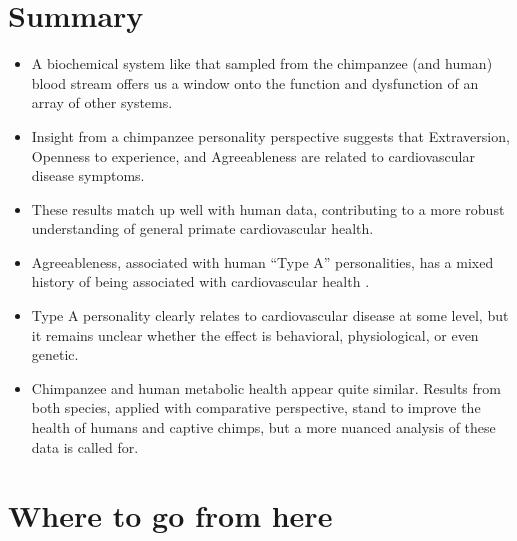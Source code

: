 \documentclass[a0,landscape]{a0poster}
\begin{document}

\color{NavyBlue}
\section*{Summary}

\begin{itemize}
\color{NavyBlue}
\item A biochemical system like that sampled from the chimpanzee (and human) blood stream offers us a window onto the function and dysfunction of an array of other systems.
\item Insight from a chimpanzee personality perspective suggests that Extraversion, Openness to experience, and Agreeableness are related to cardiovascular disease symptoms.
\item These results match up well with human data, contributing to a more robust understanding of general primate cardiovascular health.
\item Agreeableness, associated with human ``Type A'' personalities, has a mixed history of being associated with cardiovascular health \cite{sutin2010cholesterol}.
\item Type A personality clearly relates to cardiovascular disease at some level, but it remains unclear whether the effect is behavioral, physiological, or even genetic.
\item Chimpanzee and human metabolic health appear quite similar. Results from both species, applied with comparative perspective, stand to improve the health of humans and captive chimps, but a more nuanced analysis of these data is called for.


\end{itemize}



\color{Maroon}
\section*{Where to go from here}
\end{document}
